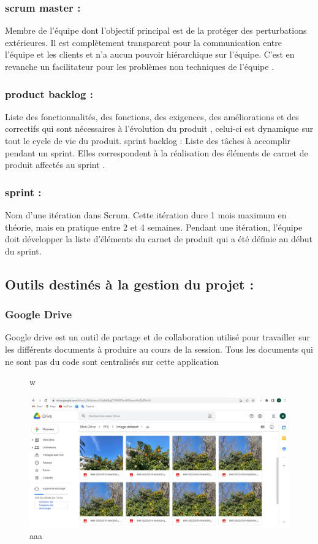 	\subsubsection{scrum master  :}
	Membre de l'équipe dont l'objectif principal est de la protéger des perturbations extérieures. Il est complètement transparent pour la communication entre l'équipe et les clients et n'a aucun pouvoir hiérarchique sur l'équipe. C'est en revanche un facilitateur pour les problèmes non techniques de l'équipe .
	\subsubsection{product backlog  :}
	Liste des fonctionnalités, des fonctions, des exigences, des améliorations et des correctifs qui sont nécessaires à l'évolution du produit , celui-ci est dynamique sur tout le cycle de vie du produit.
	sprint backlog  :
	Liste des tâches à accomplir pendant un sprint. Elles correspondent à la réalisation des éléments de carnet de produit affectés au sprint .
	\subsubsection{sprint :}
	Nom d'une itération dans Scrum. Cette itération dure 1 mois maximum en théorie, mais en pratique entre 2 et 4 semaines. Pendant une itération, l'équipe doit développer la liste d'éléments du carnet de produit qui a été définie au début du sprint.
	\subsection{Outils destinés à la gestion du projet :}
	\subsubsection{Google Drive}
	Google drive est un outil de partage et de collaboration utilisé pour travailler sur les différents
	documents à produire au cours de la session. Tous les documents qui ne sont pas du code sont
	centralisés sur cette application
	\begin{figure} [h]w
		\begin{center}
			\centering
		\includegraphics[width=0.7\linewidth]{Images/2022-04-09 (7)}
		\end{center}
		\caption{aaa}
	\end{figure}
	\newpage
